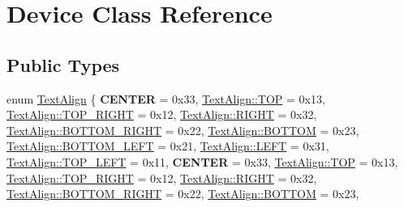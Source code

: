 \hypertarget{classDevice}{}\section{Device Class Reference}
\label{classDevice}
\subsection*{Public Types}
\begin{DoxyCompactItemize}
\item 
enum \hyperlink{classDevice_a62f8577d4803c8fce764f7cdff2abe92}{Text\+Align} \{ \newline
{\bfseries C\+E\+N\+T\+ER} = 0x33, 
\hyperlink{classDevice_a62f8577d4803c8fce764f7cdff2abe92a6705777b712ee811e76fb07162081d63}{Text\+Align\+::\+T\+OP} = 0x13, 
\hyperlink{classDevice_a62f8577d4803c8fce764f7cdff2abe92a901d87dedda8db733f5e6d34c4eb5fe0}{Text\+Align\+::\+T\+O\+P\+\_\+\+R\+I\+G\+HT} = 0x12, 
\hyperlink{classDevice_a62f8577d4803c8fce764f7cdff2abe92a21507b40c80068eda19865706fdc2403}{Text\+Align\+::\+R\+I\+G\+HT} = 0x32, 
\newline
\hyperlink{classDevice_a62f8577d4803c8fce764f7cdff2abe92a341b72aaab1308a3e6667af1e52f5def}{Text\+Align\+::\+B\+O\+T\+T\+O\+M\+\_\+\+R\+I\+G\+HT} = 0x22, 
\hyperlink{classDevice_a62f8577d4803c8fce764f7cdff2abe92a1fabf63de5c96c78e2a40805bcdeb73b}{Text\+Align\+::\+B\+O\+T\+T\+OM} = 0x23, 
\hyperlink{classDevice_a62f8577d4803c8fce764f7cdff2abe92a8d81ac82421d1b03da58fccb9174892e}{Text\+Align\+::\+B\+O\+T\+T\+O\+M\+\_\+\+L\+E\+FT} = 0x21, 
\hyperlink{classDevice_a62f8577d4803c8fce764f7cdff2abe92a684d325a7303f52e64011467ff5c5758}{Text\+Align\+::\+L\+E\+FT} = 0x31, 
\newline
\hyperlink{classDevice_a62f8577d4803c8fce764f7cdff2abe92a747385047b85ae751f83adb36435a3c1}{Text\+Align\+::\+T\+O\+P\+\_\+\+L\+E\+FT} = 0x11, 
{\bfseries C\+E\+N\+T\+ER} = 0x33, 
\hyperlink{classDevice_a62f8577d4803c8fce764f7cdff2abe92a6705777b712ee811e76fb07162081d63}{Text\+Align\+::\+T\+OP} = 0x13, 
\hyperlink{classDevice_a62f8577d4803c8fce764f7cdff2abe92a901d87dedda8db733f5e6d34c4eb5fe0}{Text\+Align\+::\+T\+O\+P\+\_\+\+R\+I\+G\+HT} = 0x12, 
\newline
\hyperlink{classDevice_a62f8577d4803c8fce764f7cdff2abe92a21507b40c80068eda19865706fdc2403}{Text\+Align\+::\+R\+I\+G\+HT} = 0x32, 
\hyperlink{classDevice_a62f8577d4803c8fce764f7cdff2abe92a341b72aaab1308a3e6667af1e52f5def}{Text\+Align\+::\+B\+O\+T\+T\+O\+M\+\_\+\+R\+I\+G\+HT} = 0x22, 
\hyperlink{classDevice_a62f8577d4803c8fce764f7cdff2abe92a1fabf63de5c96c78e2a40805bcdeb73b}{Text\+Align\+::\+B\+O\+T\+T\+OM} = 0x23, 

\end{DoxyCompactItemize}
